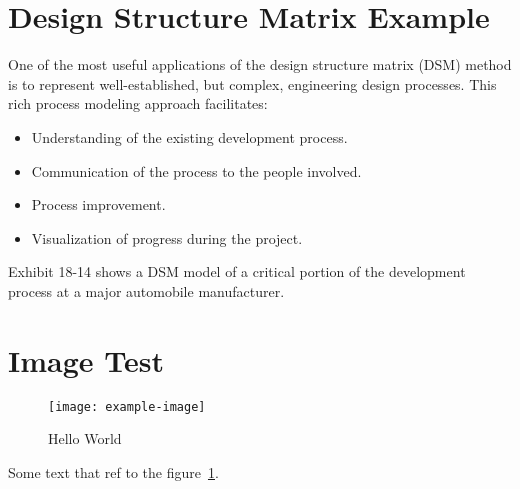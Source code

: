 %
%
%
%
%
%

\begin{appendices}
  \section{Design Structure Matrix Example}
  One of the most useful applications of the design structure matrix (DSM) method is to represent well-established, but complex, engineering design processes. This rich process modeling approach facilitates:
  \begin{itemize}
    \item Understanding of the existing development process.
    \item Communication of the process to the people involved.
    \item Process improvement.
    \item Visualization of progress during the project.
  \end{itemize}

Exhibit 18-14 shows a DSM model of a critical portion of the development process at a major automobile manufacturer.

\section{Image Test}

\begin{figure}[htbp]
  \centering
  \texttt{[image: example-image]}
  \caption{Hello World}\label{fig:2}
\end{figure}

Some text that ref to the figure~\ref{fig:2}.

\end{appendices}
